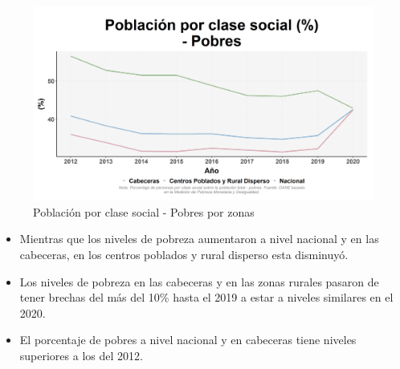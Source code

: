    \begin{figure}[H]
        \caption{Población por clase social - Pobres por zonas \label{map_result_2} }
        \begin{center}
        \includegraphics[width=\textwidth,keepaspectratio]{img/var_243_trend.png}
        \end{center}
    \end{figure}
            \begin{itemize}
                    \item Mientras que los niveles de pobreza aumentaron a nivel nacional y en las cabeceras, en los centros poblados y rural disperso esta disminuyó.
                    \item Los niveles de pobreza en las cabeceras y en las zonas rurales pasaron de tener brechas del más del 10\% hasta el 2019 a estar a niveles similares en el 2020.
                    \item El porcentaje de pobres a nivel nacional y en cabeceras tiene niveles superiores a los del 2012.
                    \end{itemize}

